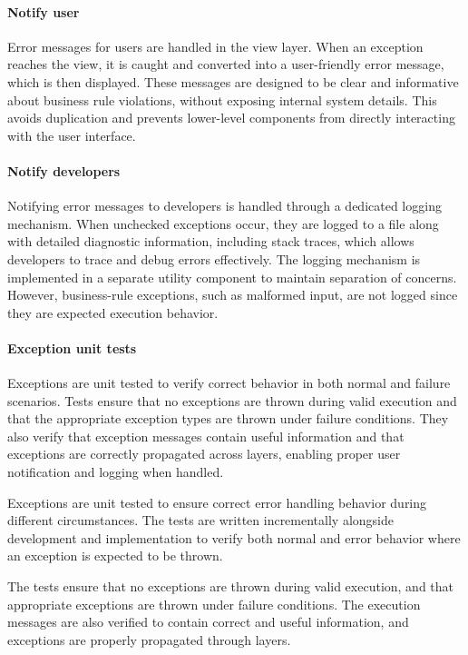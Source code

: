 \documentclass[a4paper]{scrartcl}
\begin{document}
\paragraph{Notify user}

Error messages for users are handled in the view layer. When an exception reaches the view, it is caught and converted into a user-friendly error message, which is then displayed. These messages are designed to be clear and informative about business rule violations, without exposing internal system details. This avoids duplication and prevents lower-level components from directly interacting with the user interface.

\paragraph{Notify developers}

Notifying error messages to developers is handled through a dedicated logging mechanism. When unchecked exceptions occur, they are logged to a file along with detailed diagnostic information, including stack traces, which allows developers to trace and debug errors effectively. The logging mechanism is implemented in a separate utility component to maintain separation of concerns. However, business-rule exceptions, such as malformed input, are not logged since they are expected execution behavior.

\paragraph{Exception unit tests}

Exceptions are unit tested to verify correct behavior in both normal and failure scenarios. Tests ensure that no exceptions are thrown during valid execution and that the appropriate exception types are thrown under failure conditions. They also verify that exception messages contain useful information and that exceptions are correctly propagated across layers, enabling proper user notification and logging when handled.


\iffalse
Exceptions are unit tested to ensure correct error handling behavior during different circumstances. The tests are written incrementally alongside development and implementation to verify both normal and error behavior where an exception is expected to be thrown.

The tests ensure that no exceptions are thrown during valid execution, and that appropriate exceptions are thrown under failure conditions. The execution messages are also verified to contain correct and useful information, and exceptions are properly propagated through layers.
\end{document}
